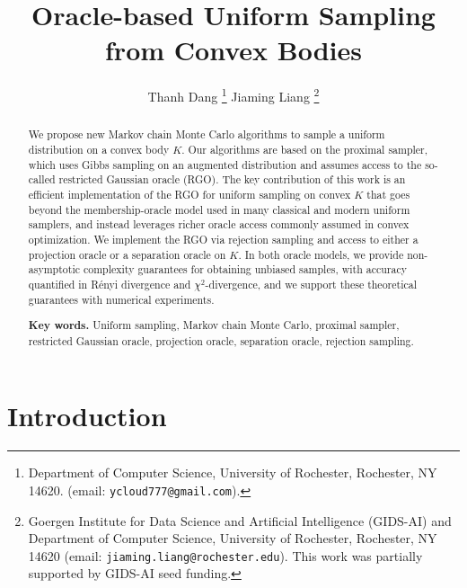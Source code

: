 \documentclass[11pt,letterpaper]{article}
\begin{document}
	\title{Oracle-based Uniform Sampling from Convex Bodies}
	\date{}
	\author{
    	Thanh Dang  \thanks{Department of Computer Science, University of Rochester, Rochester, NY 14620. 
        (email: {\tt ycloud777@gmail.com}).}
        \qquad
	 	Jiaming Liang \thanks{
        Goergen Institute for Data Science and Artificial Intelligence (GIDS-AI) and Department of Computer Science, University of Rochester, Rochester, NY 14620 (email: {\tt jiaming.liang@rochester.edu}). This work was partially supported by GIDS-AI seed funding.}
	}
\maketitle
	
	\begin{abstract}	
We propose new Markov chain Monte Carlo algorithms to sample a uniform distribution on a convex body $K$. Our algorithms are based on the proximal sampler, which uses Gibbs sampling on an augmented distribution and assumes access to the so-called restricted Gaussian oracle (RGO). The key contribution of this work is an efficient implementation of the RGO for uniform sampling on convex $K$ that goes beyond the membership-oracle model used in many classical and modern uniform samplers, and instead leverages richer oracle access commonly assumed in convex optimization. We implement the RGO via rejection sampling and access to either a projection oracle or a separation oracle on $K$. In both oracle models, we provide non-asymptotic complexity guarantees for obtaining unbiased samples, with accuracy quantified in R\'enyi divergence and $\chi^2$-divergence, and we support these theoretical guarantees with numerical experiments.

	
	
	{\bf Key words.}   Uniform sampling, Markov chain Monte Carlo, proximal sampler, restricted Gaussian oracle, projection oracle, separation oracle, rejection sampling. 
		
		
	\end{abstract}

\section{Introduction}
\label{sec:intro}
\end{document}
